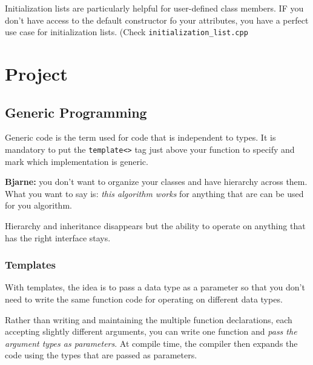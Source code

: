 \documentclass[11pt, a4paper]{article}
\begin{document}
Initialization lists are particularly helpful for user-defined class members. IF you don't have access to the default constructor fo your attributes, you have a perfect use case for initialization lists. (Check \texttt{initialization\_list.cpp}


\section{Project}%
\label{sec:project}






























\subsection{Generic Programming}%
\label{ssub:generic_programming}

Generic code is the term used for code that is independent to types. It is mandatory to put the \texttt{template<>} tag just above your function to specify and mark which implementation is generic.


\textbf{Bjarne:} you don't want to organize your classes and have hierarchy across them. What you want to say is: \textit{this algorithm works} for anything that are can be used for you algorithm. 


Hierarchy and inheritance disappears but the ability to operate on anything that has the right interface stays. 

\subsubsection{Templates}%
\label{ssub:templates}



With templates, the idea is to pass a data type as a parameter so that you don't need to write the same function code for operating on different data types. 

Rather than writing and maintaining the multiple function declarations, each accepting slightly different arguments, you can write one function and \textit{pass the argument types as parameters}. At compile time, the compiler then expands the code using the types that are passed as parameters. 
\end{document}
